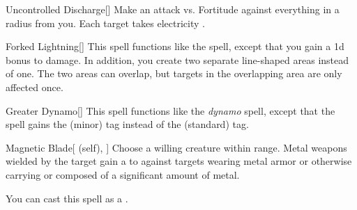 \lowercase{\hypertarget{spell:Uncontrolled Discharge}{}}\label{spell:Uncontrolled Discharge}
\begin{apability}[\nth{2}]{\hypertarget{spell:Uncontrolled Discharge}{Uncontrolled Discharge}}[]
Make an attack vs. Fortitude against everything in a \areamed radius from you.
\hit Each target takes electricity .
\end{apability}
\vspace{0.25em}



\lowercase{\hypertarget{spell:Forked Lightning}{}}\label{spell:Forked Lightning}
\begin{apability}[\nth{3}]{\hypertarget{spell:Forked Lightning}{Forked Lightning}}[]
This spell functions like the  spell, except that you gain a \plus1d bonus to damage.
In addition, you create two separate line-shaped areas instead of one.
The two areas can overlap, but targets in the overlapping area are only affected once.
\end{apability}
\vspace{0.25em}



\lowercase{\hypertarget{spell:Greater Dynamo}{}}\label{spell:Greater Dynamo}
\begin{apability}[\nth{3}]{\hypertarget{spell:Greater Dynamo}{Greater Dynamo}}[]
This spell functions like the \textit{dynamo} spell, except that the spell gains the  (minor) tag instead of the  (standard) tag.
\end{apability}
\vspace{0.25em}



\lowercase{\hypertarget{spell:Magnetic Blade}{}}\label{spell:Magnetic Blade}
\begin{attuneability}[\nth{3}]{\hypertarget{spell:Magnetic Blade}{Magnetic Blade}}[ (self), ]
Choose a willing creature within \rngclose range.
Metal weapons wielded by the target gain a   to  against targets wearing metal armor or otherwise carrying or composed of a significant amount of metal.

You can cast this spell as a .
\end{attuneability}
\vspace{0.25em}



